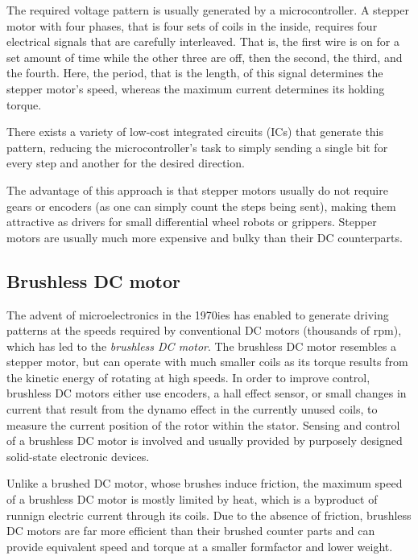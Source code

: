 The required voltage pattern is usually generated by a microcontroller. A stepper motor with four phases, that is four sets of coils in the inside, requires four electrical signals that are carefully interleaved. That is, the first wire is on for a set amount of time while the other three are off, then the second, the third, and the fourth. Here, the period, that is the length, of this signal determines the stepper motor's speed, whereas the maximum current determines its holding torque. 

There exists a variety of low-cost integrated circuits (ICs) that generate this pattern, reducing the microcontroller's task to simply sending a single bit for every step and another for the desired direction. 

The advantage of this approach is that stepper motors usually do not require gears or encoders (as one can simply count the steps being sent), making them attractive as drivers for small differential wheel robots or grippers. Stepper motors are usually much more expensive and bulky than their DC counterparts.

\subsection{Brushless DC motor}\label{sec:brushlessDC}
The advent of microelectronics in the 1970ies has enabled to generate driving patterns at the speeds required by conventional DC motors (thousands of rpm), which has led to the \emph{brushless DC motor}. The brushless DC motor resembles a stepper motor, but can operate with much smaller coils as its torque results from the kinetic energy of rotating at high speeds. In order to improve control, brushless DC motors either use encoders, a hall effect sensor, or small changes in current that result from the dynamo effect in the currently unused coils, to measure the current position of the rotor within the stator. Sensing and control of a brushless DC motor is involved and usually provided by purposely designed solid-state electronic devices. 

Unlike a brushed DC motor, whose brushes induce friction, the maximum speed of a brushless DC motor is mostly limited by heat, which is a byproduct of runnign electric current through its coils. Due to the absence of friction, brushless DC motors are far more efficient than their brushed counter parts and can provide equivalent speed and torque at a smaller formfactor and lower weight. 

